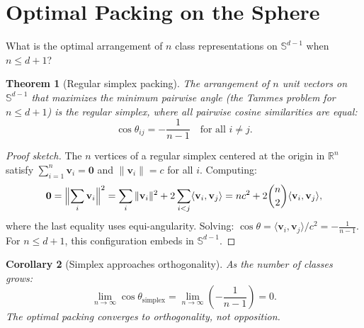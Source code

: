 \documentclass[11pt,a4paper]{article}
\newtheorem{theorem}{Theorem}
\newtheorem{corollary}[theorem]{Corollary}
\theoremstyle{remark}
\begin{document}
\section{Optimal Packing on the Sphere}
\label{sec:simplex}

What is the optimal arrangement of $n$ class representations on $\mathbb{S}^{d-1}$ when $n \leq d + 1$?

\begin{theorem}[Regular simplex packing]
\label{thm:simplex}
The arrangement of $n$ unit vectors on $\mathbb{S}^{d-1}$ that maximizes the minimum pairwise angle (the Tammes problem for $n \leq d+1$) is the regular simplex, where all pairwise cosine similarities are equal:
\begin{equation}
  \cos\theta_{ij} = -\frac{1}{n-1} \quad \text{for all } i \neq j.
  \label{eq:simplex}
\end{equation}
\end{theorem}

\begin{proof}[Proof sketch]
The $n$ vertices of a regular simplex centered at the origin in $\mathbb{R}^n$ satisfy $\sum_{i=1}^n \mathbf{v}_i = \mathbf{0}$ and $\|\mathbf{v}_i\| = c$ for all $i$.
Computing:
\[
  \mathbf{0} = \Bigl\|\sum_i \mathbf{v}_i\Bigr\|^2 = \sum_i \|\mathbf{v}_i\|^2 + 2\sum_{i<j} \langle\mathbf{v}_i, \mathbf{v}_j\rangle = nc^2 + 2\binom{n}{2}\langle\mathbf{v}_i, \mathbf{v}_j\rangle,
\]
where the last equality uses equi-angularity.
Solving: $\cos\theta = \langle\mathbf{v}_i, \mathbf{v}_j\rangle/c^2 = -\frac{1}{n-1}$.
For $n \leq d+1$, this configuration embeds in $\mathbb{S}^{d-1}$.
\end{proof}

\begin{corollary}[Simplex approaches orthogonality]
\label{cor:simplex-limit}
As the number of classes grows:
\[
  \lim_{n \to \infty} \cos\theta_\text{simplex} = \lim_{n \to \infty} \left(-\frac{1}{n-1}\right) = 0.
\]
The optimal packing converges to orthogonality, not opposition.
\end{corollary}
\end{document}
